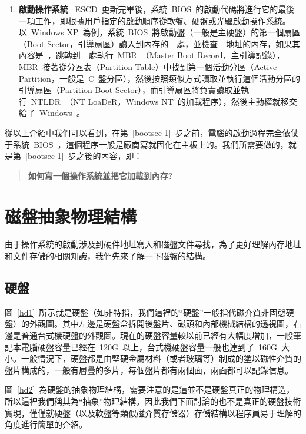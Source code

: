 \begin{enumerate}
\item{\textbf{啟動操作系統}} \label{bootsec-1} ~ESCD~更新完畢後，系統~BIOS~的啟動代碼將進行它的最後一項工作，即根據用戶指定的啟動順序從軟盤、硬盤或光驅啟動操作系統。以~Windows XP~為例，系統~BIOS~將啟動盤（一般是主硬盤）的第一個扇區（Boot Sector，引導扇區）讀入到內存的~~處，並檢查~~地址的內存，如果其內容是~，跳轉到~~處執行~MBR~（Master Boot Record，主引導記錄），MBR~接著從分區表（Partition Table）中找到第一個活動分區（Active Partition，一般是~C~盤分區），然後按照類似方式讀取並執行這個活動分區的引導扇區（Partition Boot Sector），而引導扇區將負責讀取並執行~NTLDR~（NT LoaDeR，Windows NT~的加載程序），然後主動權就移交給了~Windows~。
\end{enumerate}

從以上介紹中我們可以看到，在第~\ref{bootsec-1}~步之前，電腦的啟動過程完全依仗于系統~BIOS~，這個程序一般是廠商寫就固化在主板上的。我們所需要做的，就是第~\ref{bootsec-1}~步之後的內容，即：
\begin{quote}
\textbf{如何寫一個操作系統並把它加載到內存?}
\end{quote}

\section{磁盤抽象物理結構}\label{disk_structure}

由于操作系統的啟動涉及到硬件地址寫入和磁盤文件尋找，為了更好理解內存地址和文件存儲的相關知識，我們先來了解一下磁盤的結構。

\subsection{硬盤}


圖~\ref{hd1}~所示就是硬盤（如非特指，我們這裡的“硬盤”一般指代磁介質非固態硬盤）的外觀圖。其中左邊是硬盤盒拆開後盤片、磁頭和內部機械結構的透視圖，右邊是普通台式機硬盤的外觀圖。現在的硬盤容量較以前已經有大幅度增加，一般筆記本電腦硬盤容量已經在~120G~以上，台式機硬盤容量一般也達到了~160G~大小。一般情況下，硬盤都是由堅硬金屬材料（或者玻璃等）制成的塗以磁性介質的盤片構成的，一般有層疊的多片，每個盤片都有兩個面，兩面都可以記錄信息。


圖~\ref{hd2}~為硬盤的抽象物理結構，需要注意的是這並不是硬盤真正的物理構造，所以這裡我們稱其為“抽象”物理結構。因此我們下面討論的也不是真正的硬盤技術實現，僅僅就硬盤（以及軟盤等類似磁介質存儲器）存儲結構以程序員易于理解的角度進行簡單的介紹。

